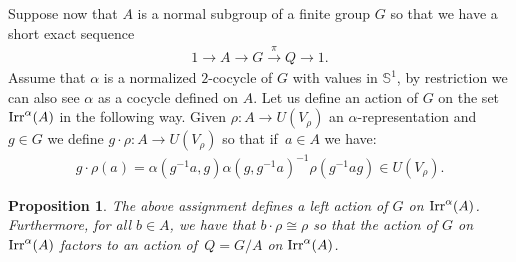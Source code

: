 \documentclass[11pt]{article}
\numberwithin{equation}{section}
\def\S{\mathbb{S}}
\DeclareMathOperator{\Irr}{\textup{Irr}}
\newtheorem{Pro}[Th]{Proposition}
\theoremstyle{definition}
\numberwithin{equation}{section}
\begin{document}
Suppose now that $A$ is a normal subgroup of a finite group $G$ so that we have a short exact
sequence
\begin{gather*}
1\rightarrow A\rightarrow G\stackrel{\pi}{\rightarrow} Q\rightarrow 1.
\end{gather*}
Assume that $\alpha$ is a normalized $2$-cocycle of $G$ with values in $\S^{1}$,
by restriction we can also see $\alpha$ as a cocycle defined on $A$.
Let us define an action of $G$ on the set $\Irr^{\alpha}(A)$ in the following way.
Given $\rho\colon A\rightarrow U(V_{\rho})$ an $\alpha$-representation and $g\in G$ we define
$g\cdot \rho\colon A\rightarrow U(V_{\rho})$ so that if~$a\in A$ we have:
\begin{gather}\label{def:act}
g\cdot \rho(a)=\alpha(g^{-1}a,g)\alpha(g,g^{-1}a)^{-1}\rho(g^{-1}ag)\in U(V_{\rho}).
\end{gather}

\begin{Pro}
The above assignment defines a left action of $G$ on $\Irr^{\alpha}(A)$. Furthermore, for all
$b\in A$, we have that $b\cdot\rho\cong\rho$ so that the action of $G$ on $\Irr^{\alpha}(A)$
factors to an action of~$Q=G/A$ on $\Irr^{\alpha}(A)$.
\end{Pro}
\end{document}
